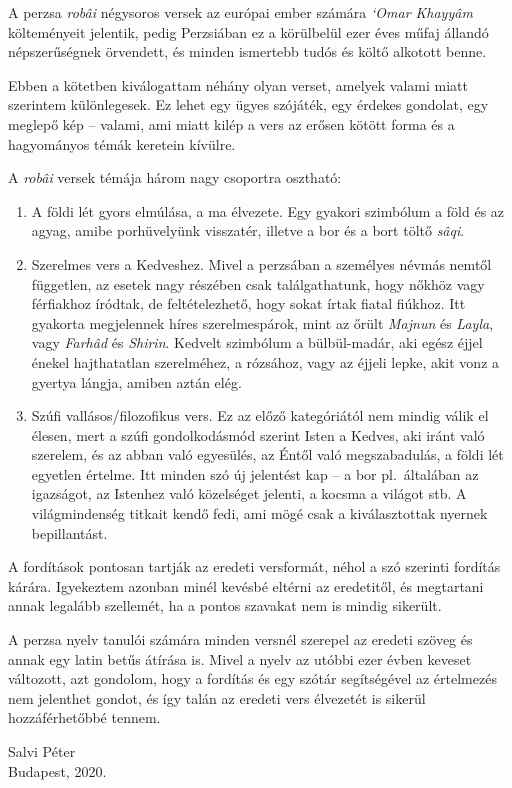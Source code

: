 A perzsa \emph{robâi} négysoros versek az európai ember számára \emph{`Omar
Khayyâm} költeményeit jelentik, pedig Perzsiában ez a körülbelül ezer
éves műfaj állandó népszerűségnek örvendett, és minden ismertebb tudós
és költő alkotott benne.

Ebben a kötetben kiválogattam néhány olyan verset, a\-me\-lyek valami
miatt szerintem különlegesek. Ez lehet egy ügyes szójáték, egy érdekes
gondolat, egy meglepő kép -- valami, ami miatt kilép a vers az erősen
kötött forma és a hagyományos témák keretein kívülre.

A \emph{robâi} versek témája három nagy csoportra osztható:

\begin{enumerate}
\item A földi lét gyors elmúlása, a ma élvezete. Egy gyakori
  szimbólum a föld és az agyag, amibe porhüvelyünk visszatér, illetve
  a bor és a bort töltő \emph{sâqi}.
\item Szerelmes vers a Kedveshez. Mivel a perzsában a személyes névmás
  nemtől független, az esetek nagy részében csak találgathatunk, hogy
  nőkhöz vagy férfiakhoz íródtak, de feltételezhető, hogy sokat írtak
  fiatal fiúkhoz. Itt gyakorta megjelennek híres szerelmespárok, mint
  az őrült \emph{Majnun} és \emph{Layla}, vagy \emph{Farhâd} és
  \emph{Shirin}. Kedvelt szimbólum a bülbül-madár, aki egész éjjel
  énekel hajthatatlan szerelméhez, a rózsához, vagy az éjjeli lepke,
  akit vonz a gyertya lángja, amiben aztán elég.
\item Szúfi vallásos/filozofikus vers. Ez az előző kategóriától nem mindig válik
  el élesen, mert a szúfi gondolkodásmód szerint Isten a Kedves, aki
  iránt való szerelem, és az abban való egyesülés, az Éntől való
  megszabadulás, a földi lét egyetlen értelme. Itt minden szó új
  jelentést kap -- a bor pl.~általában az igazságot, az Istenhez való
  közelséget jelenti, a kocsma a világot stb. A világmindenség titkait
  kendő fedi, ami mögé csak a kiválasztottak nyernek bepillantást.
\end{enumerate}

A fordítások pontosan tartják az eredeti versformát, néhol a szó
szerinti fordítás kárára. Igyekeztem azonban minél kevésbé eltérni az
eredetitől, és megtartani annak legalább szellemét, ha a pontos
szavakat nem is mindig sikerült.

A perzsa nyelv tanulói számára minden versnél szerepel az eredeti
szöveg és annak egy latin betűs átírása is. Mivel a nyelv az utóbbi
ezer évben keveset változott, azt gondolom, hogy a fordítás és egy
szótár segítségével az értelmezés nem jelenthet gondot, és így talán
az eredeti vers élvezetét is sikerül hozzáférhetőbbé tennem.

\begin{flushright}
  Salvi Péter\\
  Budapest, 2020.
\end{flushright}
